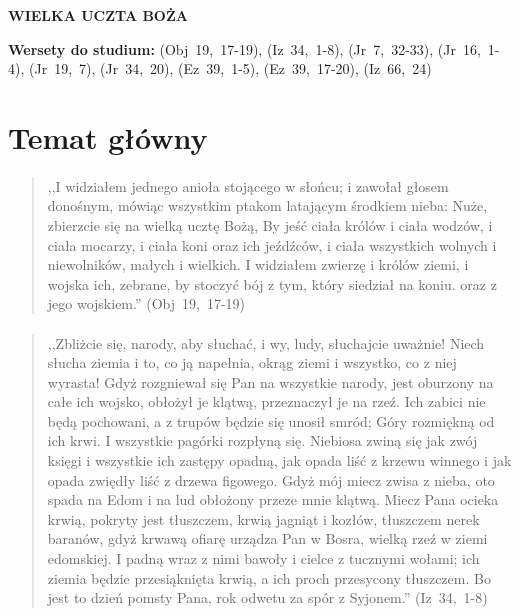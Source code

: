 \documentclass[10pt,a4paper,oneside]{article}
\begin{document}
\centerline{\textbf{\MakeUppercase{Wielka uczta Boża}}}
\begin{center}
\textbf{Wersety do studium:} 
\mbox{(Obj 19, 17-19)}, \mbox{(Iz 34, 1-8)}, \mbox{(Jr 7, 32-33)}, \mbox{(Jr 16, 1-4)}, \mbox{(Jr 19, 7)}, \mbox{(Jr 34, 20)}, \mbox{(Ez 39, 1-5)}, \mbox{(Ez 39, 17-20)}, \mbox{(Iz 66, 24)}
\end{center}
\section{Temat główny}
\paragraph{}
\begin{quote}
,,I widziałem jednego anioła stojącego w słońcu; i zawołał głosem donośnym, mówiąc wszystkim ptakom latającym środkiem nieba: Nuże, zbierzcie się na wielką ucztę Bożą, By jeść ciała królów i ciała wodzów, i ciała mocarzy, i ciała koni oraz ich jeźdźców, i ciała wszystkich wolnych i niewolników, małych i wielkich. I widziałem zwierzę i królów ziemi, i wojska ich, zebrane, by stoczyć bój z tym, który siedział na koniu. oraz z jego wojskiem.'' \mbox{(Obj 19, 17-19)}
\end{quote}
\paragraph{}
\begin{quote}
,,Zbliżcie się, narody, aby słuchać, i wy, ludy, słuchajcie uważnie! Niech słucha ziemia i to, co ją napełnia, okrąg ziemi i wszystko, co z niej wyrasta! Gdyż rozgniewał się Pan na wszystkie narody, jest oburzony na całe ich wojsko, obłożył je klątwą, przeznaczył je na rzeź. Ich zabici nie będą pochowani, a z trupów będzie się unosił smród; Góry rozmiękną od ich krwi. I wszystkie pagórki rozpłyną się. Niebiosa zwiną się jak zwój księgi i wszystkie ich zastępy opadną, jak opada liść z krzewu winnego i jak opada zwiędły liść z drzewa figowego. Gdyż mój miecz zwisa z nieba, oto spada na Edom i na lud obłożony przeze mnie klątwą. Miecz Pana ocieka krwią, pokryty jest tłuszczem, krwią jagniąt i kozłów, tłuszczem nerek baranów, gdyż krwawą ofiarę urządza Pan w Bosra, wielką rzeź w ziemi edomskiej. I padną wraz z nimi bawoły i cielce z tucznymi wołami; ich ziemia będzie przesiąknięta krwią, a ich proch przesycony tłuszczem. Bo jest to dzień pomsty Pana, rok odwetu za spór z Syjonem.'' \mbox{(Iz 34, 1-8)}
\end{quote}
\end{document}
